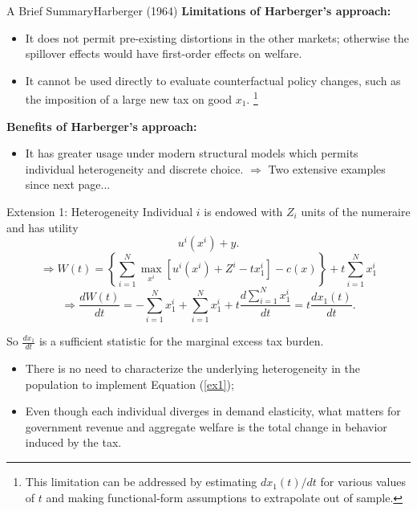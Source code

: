 \documentclass{beamer}
\begin{document}
\begin{frame}{A Brief Summary}{Harberger (1964)}
	\textbf{Limitations of Harberger's approach:}
	\begin{itemize}
		\item It does not permit pre-existing distortions in the other markets; otherwise the spillover effects would have first-order effects on welfare.
		\item It cannot be used directly to evaluate counterfactual policy changes, such as the imposition of a large new tax on good $x_1$. \footnote{This limitation can be addressed by estimating $dx_1(t)/dt$ for various values of $t$ and making
		functional-form assumptions to extrapolate out of sample.}
	\end{itemize}
	\medskip

	\textbf{Benefits of Harberger’s approach:}
	\begin{itemize}
		\item It has greater usage under modern structural models which permits individual heterogeneity and discrete choice. $\Rightarrow$ Two extensive examples since next page...
	\end{itemize}
\end{frame}
\begin{frame}{Extension 1: Heterogeneity}
	Individual $i$ is endowed with $Z_i$ units of the numeraire and has utility
	\begin{equation}
		u^i(x^i) + y.
	\end{equation}
	\begin{equation}
		\Rightarrow W(t) = \left\{\sum_{i=1}^N\max_{x^i}\left[u^i(x^i)+Z^i-tx_1^i\right]-c(x) \right\} + t\sum_{i=1}^Nx_1^i
	\end{equation}
	\begin{equation}\label{ex1}
		\Rightarrow \frac{dW(t)}{dt} = -\sum_{i=1}^N x_1^i + \sum_{i=1}^N x_1^i + t\frac{d\sum_{i=1}^Nx_1^i}{dt} = t\frac{dx_1(t)}{dt}.
	\end{equation}

	So $\frac{dx_1}{dt}$ is a sufficient statistic for the marginal excess tax burden.
	\begin{itemize}
		\item There is no need to characterize the underlying heterogeneity in the population to implement Equation (\ref{ex1});
		\item Even though each individual diverges in demand elasticity, what matters for government revenue and aggregate welfare is the total change in behavior induced by the tax.
	\end{itemize}
\end{frame}
\end{document}
